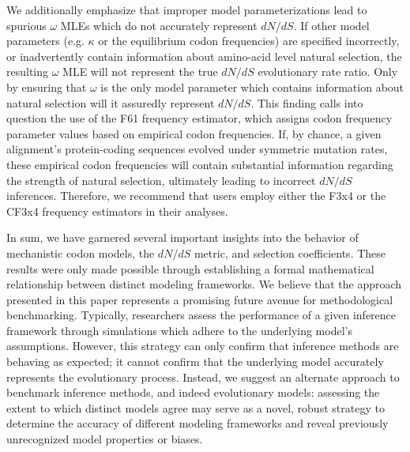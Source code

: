 \documentclass{pnastwo}
\begin{document}
\begin{article}
We additionally emphasize that improper model parameterizations lead to spurious $\omega$ MLEs which do not accurately represent $dN/dS$. If other model parameters (e.g. $\kappa$ or the equilibrium codon frequencies) are specified incorrectly, or inadvertently contain information about amino-acid level natural selection, the resulting $\omega$ MLE will not represent the true $dN/dS$ evolutionary rate ratio. Only by ensuring that $\omega$ is the only model parameter which contains information about natural selection will it assuredly represent $dN/dS$. This finding calls into question the use of the F61 frequency estimator, which assigns codon frequency parameter values based on empirical codon frequencies. If, by chance, a given alignment's protein-coding sequences evolved under symmetric mutation rates, these empirical codon frequencies will contain substantial information regarding the strength of natural selection, ultimately leading to incorrect $dN/dS$ inferences. Therefore, we recommend that users employ either the F3x4 \cite{MuseGaut1994} or the CF3x4 \cite{Pond2010} frequency estimators in their analyses.


In sum, we have garnered several important insights into the behavior of mechanistic codon models, the $dN/dS$ metric, and selection coefficients. These results were only made possible through establishing a formal mathematical relationship between distinct modeling frameworks. We believe that the approach presented in this paper represents a promising future avenue for methodological benchmarking. Typically, researchers assess the performance of a given inference framework through simulations which adhere to the underlying model's assumptions. However, this strategy can only confirm that inference methods are behaving as expected; it cannot confirm that the underlying model accurately represents the evolutionary process. Instead, we suggest an alternate approach to benchmark inference methods, and indeed evolutionary models: assessing the extent to which distinct models agree may serve as a novel, robust strategy to determine the accuracy of different modeling frameworks and reveal previously unrecognized model properties or biases.




\end{article}
\end{document}
